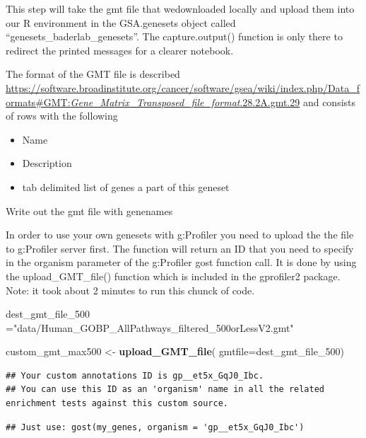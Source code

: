 \documentclass[
]{book}
\newenvironment{Shaded}{\begin{snugshade}}{\end{snugshade}}
\newcommand{\AttributeTok}[1]{\textcolor[rgb]{0.13,0.29,0.53}{#1}}
\newcommand{\FunctionTok}[1]{\textcolor[rgb]{0.13,0.29,0.53}{\textbf{#1}}}
\newcommand{\NormalTok}[1]{#1}
\newcommand{\OtherTok}[1]{\textcolor[rgb]{0.56,0.35,0.01}{#1}}
\newcommand{\StringTok}[1]{\textcolor[rgb]{0.31,0.60,0.02}{#1}}
\providecommand{\tightlist}{%
  \setlength{\itemsep}{0pt}\setlength{\parskip}{0pt}}
\begin{document}
This step will take the gmt file that wedownloaded locally and upload them into our R environment in the GSA.genesets object called ``genesets\_baderlab\_genesets''.
The capture.output() function is only there to redirect the printed messages for a clearer notebook.

The format of the GMT file is described \href{here}{https://software.broadinstitute.org/cancer/software/gsea/wiki/index.php/Data\_formats\#GMT:\emph{Gene\_Matrix\_Transposed\_file\_format}.28.2A.gmt.29} and consists of rows with the following

\begin{itemize}
\tightlist
\item
  Name
\item
  Description
\item
  tab delimited list of genes a part of this geneset
\end{itemize}

Write out the gmt file with genenames

In order to use your own genesets with g:Profiler you need to upload the the file to g:Profiler server first. The function will return an ID that you need to specify in the organism parameter of the g:Profiler gost function call.
It is done by using the upload\_GMT\_file() function which is included in the gprofiler2 package.
Note: it took about 2 minutes to run this chunck of code.

\begin{Shaded}
\begin{Highlighting}[]
\NormalTok{dest\_gmt\_file\_500 }\OtherTok{=}\StringTok{"data/Human\_GOBP\_AllPathways\_filtered\_500orLessV2.gmt"}

\NormalTok{custom\_gmt\_max500 }\OtherTok{\textless{}{-}} \FunctionTok{upload\_GMT\_file}\NormalTok{(}
                        \AttributeTok{gmtfile=}\NormalTok{dest\_gmt\_file\_500)}
\end{Highlighting}
\end{Shaded}

\begin{verbatim}
## Your custom annotations ID is gp__et5x_GqJ0_Ibc.
## You can use this ID as an 'organism' name in all the related enrichment tests against this custom source.
\end{verbatim}

\begin{verbatim}
## Just use: gost(my_genes, organism = 'gp__et5x_GqJ0_Ibc')
\end{verbatim}
\end{document}
